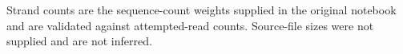 \documentclass[10pt,letterpaper]{article}
\begin{document}
\begin{table}[!htb]
\centering
\caption{Encoded files in the Goldman-code evaluation dataset.}
\label{tab:s1_test_data}
\begin{flushleft}\footnotesize Strand counts are the sequence-count weights supplied in the original notebook and are validated against attempted-read counts. Source-file sizes were not supplied and are not inferred.\end{flushleft}
\end{table}
\end{document}
